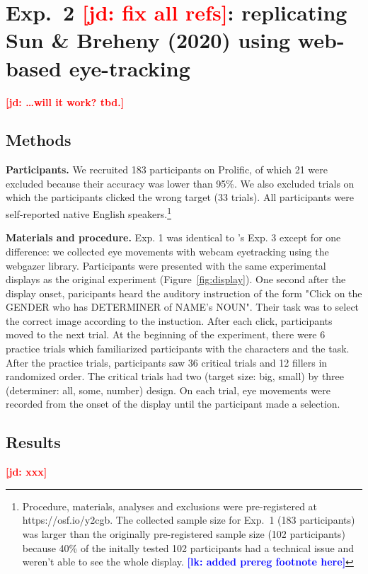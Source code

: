 \documentclass[10pt,letterpaper]{article}
\newcommand{\figref}[1]{Figure~\ref{#1}}
\newcommand{\jd}[1]{\textcolor{Red}{\textbf{[jd: #1]}}}
\newcommand{\lk}[1]{\textcolor{Blue}{\textbf{[lk: #1]}}}
\begin{document}
\section{Exp.~2 \jd{fix all refs}: replicating Sun \& Breheny (2020) using web-based eye-tracking}

\jd{\dots will it work? tbd.}

\subsection{Methods}

\textbf{Participants.} We recruited 183 participants on Prolific, of which 21 were excluded because their accuracy was lower than 95\%. We also excluded trials on which the participants clicked the wrong target (33 trials). All participants were self-reported native English speakers.\footnote{Procedure, materials, analyses and exclusions were pre-registered at https://osf.io/y2cgb. The collected sample size for Exp.~1 (183 participants) was larger than the originally pre-registered sample size (102 participants) because 40\% of the initally tested 102 participants had a technical issue and weren't able to see the whole display. \lk{added prereg footnote here}}

\textbf{Materials and procedure.} Exp. 1 was identical to 's Exp. 3 except for one difference: we collected eye movements with webcam eyetracking using the webgazer library. Participants were presented with the same experimental displays as the original experiment (\figref{fig:display}). One second after the display onset, paricipants heard the auditory instruction of the form "Click on the GENDER who has DETERMINER of NAME's NOUN". Their task was to select the correct image according to the instuction. After each click, participants moved to the next trial. At the beginning of the experiment, there were 6 practice trials which familiarized participants with the characters and the task. After the practice trials, participants saw 36 critical trials and 12 fillers in randomized order. The critical trials had two (target size: big, small) by three (determiner: all, some, number) design. On each trial, eye movements were recorded from the onset of the display until the participant made a selection.

\subsection{Results}
\jd{xxx}
\end{document}

